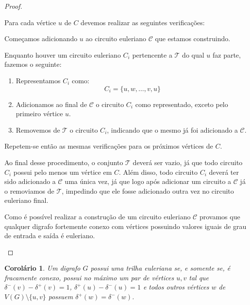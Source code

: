 \documentclass[12pt, a4paper]{article}
\newtheorem{corollary}{Corolário}
\begin{document}
\begin{proof}
\begin{enumerate}
            Para cada vértice $u$ de $C$ devemos realizar as seguintes verificações:

            \begin{tcolorbox}

                Começamos adicionando $u$ ao circuito euleriano $\mathcal{C}$ que estamos construindo.

                Enquanto houver um circuito euleriano $C_i$ pertencente a $\mathcal{T}$ do qual $u$ faz parte, fazemos o seguinte:


                \begin{enumerate}
                    \item Representamos $C_i$ como: 
                        \[
                            C_i = \{u, w, \dots, v, u\}
                        \]

                    \item Adicionamos ao final de $\mathcal{C}$ o circuito $C_i$ como representado, exceto pelo primeiro vértice $u$. 

                    \item Removemos de $\mathcal{T}$ o circuito $C_i$, indicando que o mesmo já foi adicionado a $\mathcal{C}$.

                \end{enumerate}

                Repetem-se então as mesmas verificações para os próximos vértices de $C$.
            \end{tcolorbox}


Ao final desse procedimento, o conjunto $\mathcal{T}$ deverá ser vazio, já que todo circuito $C_i$ possui pelo menos um vértice em $C$. Além disso, todo circuito $C_i$ deverá ter sido adicionado a $\mathcal{C}$ uma única vez, já que logo após adicionar um circuito a $\mathcal{C}$ já o removiamos de $\mathcal{T}$, impedindo que ele fosse adicionado outra vez no circuito euleriano final.

Como é possível realizar a construção de um circuito euleriano $\mathcal{C}$ provamos que qualquer digrafo fortemente conexo com vértices possuindo valores iguais de grau de entrada e saída é euleriano.

    \end{enumerate}
\end{proof}

\begin{corollary} 
    Um digrafo $G$ possui uma trilha euleriana se, e somente se, é fracamente conexo, possui no máximo um par de vértices $u, v$ tal que $\delta^-(v) - \delta^+(v) = 1$, $\delta^+(u) - \delta^-(u) = 1$ e todos outros vértices $w$ de $V(G) \setminus \{u, v\}$ possuem $\delta^+(w) = \delta^-(w)$.
    \label{corollary-euler-digraph}
\end{corollary}
\end{document}

